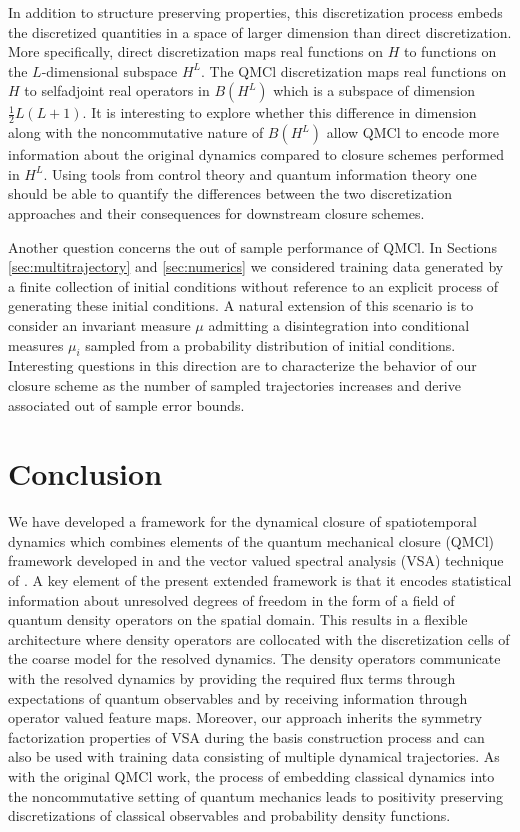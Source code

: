 \documentclass[letterpaper,10pt,3p,preprint]{elsarticle}
\begin{document}
In addition to structure preserving properties, this discretization
process embeds the discretized quantities in a space of larger
dimension than direct discretization.
More specifically, direct discretization maps real functions
on $H$ to functions on the $L$-dimensional subspace $H^L$.
The QMCl discretization maps real functions on $H$ to selfadjoint
real operators in $B(H^L)$ which is a subspace of dimension
$\frac{1}{2}L(L+1)$.
It is interesting to explore whether this difference
in dimension along with the noncommutative nature of $B(H^L)$
allow QMCl to encode more information about the original
dynamics compared to closure schemes performed in $H^L$.
Using tools from control theory \cite{Sontag1998}
and quantum information theory \cite{Nielsen2010}
one should be able to quantify the differences between the
two discretization approaches and their consequences
for downstream closure schemes.

Another question concerns the out of sample performance of QMCl.
In Sections \ref{sec:multitrajectory} and \ref{sec:numerics}
we considered training data generated by a finite collection of
initial conditions without reference to an explicit process of
generating these initial conditions.
A natural extension of this scenario is to consider an invariant
measure $\mu$ admitting a disintegration into conditional measures
$\mu_i$ sampled from a probability distribution of initial
conditions.
Interesting questions in this direction are to characterize
the behavior of our closure scheme as the number of sampled
trajectories increases and derive associated out of sample
error bounds.


\section{Conclusion}\label{sec:conclusion}
We have developed a framework for the dynamical closure of
spatiotemporal dynamics which combines elements of
the quantum mechanical closure (QMCl) framework developed in
\cite{Giannakis2019pre,Freeman2023,Freeman2024}
and the vector valued spectral analysis (VSA) technique of
\cite{Giannakis2019vsa}.
A key element of the present extended framework is that it
encodes statistical information about unresolved degrees of
freedom in the form of a field of quantum density operators
on the spatial domain.
This results in a flexible architecture where density operators are
collocated with the discretization cells of the coarse model
for the resolved dynamics.
The density operators communicate with the resolved dynamics by
providing the required flux terms through expectations of quantum
observables and by receiving information through operator valued
feature maps.
Moreover, our approach inherits the
symmetry factorization properties of VSA during the basis
construction process and can also be used with training data
consisting of multiple dynamical trajectories.
As with the original QMCl work, the process of embedding
classical dynamics into the noncommutative setting of quantum mechanics
leads to positivity preserving discretizations of classical observables
and probability density functions.
\end{document}
